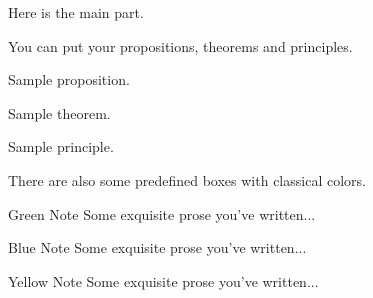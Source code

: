 Here is the main part.

You can put your propositions, theorems and principles.
\begin{proposition}
    Sample proposition.
\end{proposition}

\begin{theorem}
    Sample theorem.
\end{theorem}

\begin{principle}
    Sample principle.
\end{principle}

There are also some predefined boxes with classical colors.
\begin{greenbox}{Green Note}
    Some exquisite prose you've written...
\end{greenbox}

\begin{bluebox}{Blue Note}
    Some exquisite prose you've written...
\end{bluebox}

\begin{yellowbox}{Yellow Note}
    Some exquisite prose you've written...
\end{yellowbox}
